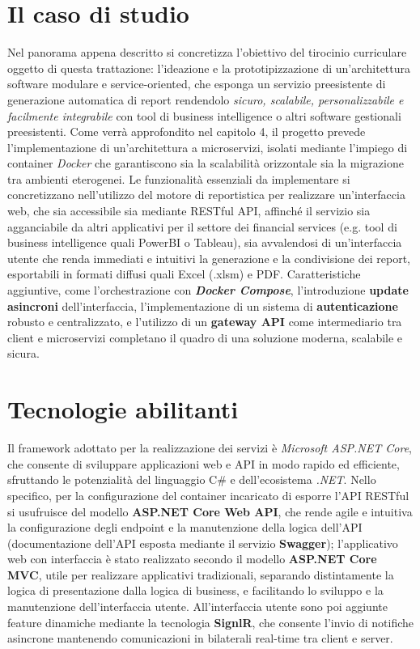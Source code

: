 \section{Il caso di studio}
Nel panorama appena descritto si concretizza l'obiettivo del tirocinio curriculare oggetto di questa trattazione: l’ideazione e la prototipizzazione di un'architettura software modulare e service-oriented, che esponga un servizio preesistente di generazione automatica di report rendendolo \emph{sicuro, scalabile, personalizzabile e facilmente integrabile} con tool di business intelligence o altri software gestionali preesistenti.
Come verrà approfondito nel capitolo 4, il progetto prevede l'implementazione di un'architettura a microservizi, isolati mediante l'impiego di container \emph{Docker} che garantiscono sia la scalabilità orizzontale sia la migrazione tra ambienti eterogenei.
Le funzionalità essenziali da implementare si concretizzano nell'utilizzo del motore di reportistica per realizzare un'interfaccia web, che sia accessibile sia mediante RESTful API, affinché il servizio sia agganciabile da altri applicativi per il settore dei financial services (e.g. tool di business intelligence quali PowerBI o Tableau), sia avvalendosi di un'interfaccia utente che renda immediati e intuitivi la generazione e la condivisione dei report, esportabili in formati diffusi quali Excel (.xlsm) e PDF.
Caratteristiche aggiuntive, come l'orchestrazione con \emph{\textbf{Docker Compose}}, l'introduzione \textbf{update asincroni} dell'interfaccia, l'implementazione di un sistema di \textbf{autenticazione} robusto e centralizzato, e l'utilizzo di un \textbf{gateway API} come intermediario tra client e microservizi completano il quadro di una soluzione moderna, scalabile e sicura.

\section{Tecnologie abilitanti}
Il framework adottato per la realizzazione dei servizi è \emph{Microsoft ASP.NET Core}, che consente di sviluppare applicazioni web e API in modo rapido ed efficiente, sfruttando le potenzialità del linguaggio C\# e dell'ecosistema \emph{.NET}.
Nello specifico, per la configurazione del container incaricato di esporre l'API RESTful si usufruisce del modello \textbf{ASP.NET Core Web API}, che rende agile e intuitiva la configurazione degli endpoint e la manutenzione della logica dell'API (documentazione dell'API esposta mediante il servizio \textbf{Swagger}); l'applicativo web con interfaccia è stato realizzato secondo il modello \textbf{ASP.NET Core MVC}, utile per realizzare applicativi tradizionali\footnotemark, separando distintamente la logica di presentazione dalla logica di business, e facilitando lo sviluppo e la manutenzione dell'interfaccia utente. All'interfaccia utente sono poi aggiunte feature dinamiche mediante la tecnologia \textbf{SignlR}, che consente l'invio di notifiche asincrone mantenendo comunicazioni in bilaterali real-time tra client e server.

